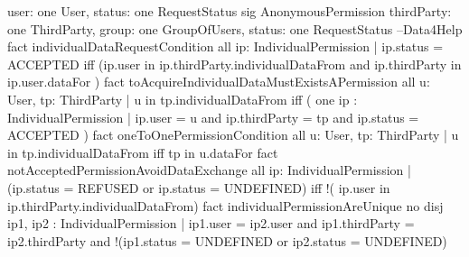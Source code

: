 \documentclass[a4paper]{article}
\begin{document}
{{\newline user: one User,
\newline status: one RequestStatus
\newline }
\newline 
\newline sig AnonymousPermission {
\newline thirdParty: one ThirdParty,
\newline group: one GroupOfUsers,
\newline status: one  RequestStatus
\newline }
\newline 
\newline --Data4Help
\newline 
\newline fact individualDataRequestCondition {
\newline all ip: IndividualPermission | ip.status = ACCEPTED iff (ip.user in ip.thirdParty.individualDataFrom and ip.thirdParty in ip.user.dataFor )
\newline }
\newline 
\newline fact toAcquireIndividualDataMustExistsAPermission{
\newline all u: User, tp: ThirdParty | u in tp.individualDataFrom iff ( one ip : IndividualPermission | ip.user = u and ip.thirdParty = tp and ip.status = ACCEPTED )
\newline }
\newline 
\newline fact oneToOnePermissionCondition{
\newline 	all u: User, tp: ThirdParty | u in tp.individualDataFrom iff tp in u.dataFor
\newline }
\newline 
\newline fact notAcceptedPermissionAvoidDataExchange{
\newline all ip: IndividualPermission | (ip.status = REFUSED or ip.status = UNDEFINED) iff !( ip.user in ip.thirdParty.individualDataFrom)
\newline }
\newline 
\newline fact individualPermissionAreUnique{
\newline no disj ip1, ip2 : IndividualPermission |  ip1.user = ip2.user and  ip1.thirdParty = ip2.thirdParty and !(ip1.status = UNDEFINED or ip2.status = UNDEFINED)
\newline }
\newline 
}
\end{document}
